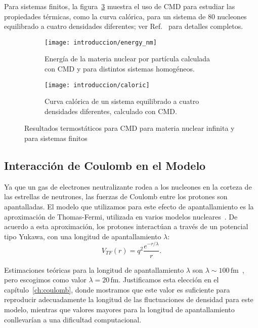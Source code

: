 Para sistemas finitos, la figura~\ref{fig:caloric} muestra el uso de CMD para estudiar las propiedades térmicas, como la curva calórica, para un sistema de 80 nucleones equilibrado a cuatro densidades diferentes; ver Ref.~\cite{dorso_isoscaling_2011} para detalles completos.

\begin{figure}[h]
  \centering
  \begin{subfigure}[h!]{0.48\columnwidth}
    \texttt{[image: introduccion/energy\_nm]}
  \caption{Energía de la materia nuclear por partícula calculada con CMD y para distintos sistemas homogéneos.}
  \label{fig:energy_nm}
  \end{subfigure}
  \begin{subfigure}[h!]{0.48\columnwidth}
  \texttt{[image: introduccion/caloric]}
  \caption{Curva calórica de un sistema equilibrado a cuatro densidades diferentes, calculado con CMD.}
  \label{fig:caloric}
  \end{subfigure}
  \caption{Resultados termostáticos para CMD para materia nuclear infinita y para sistemas finitos}
\end{figure}


\subsection{Interacción de Coulomb en el Modelo}\label{sc:coulomb}

Ya que un gas de electrones neutralizante rodea a los nucleones en la corteza de las estrellas de neutrones, las fuerzas de Coulomb entre los protones son apantalladas.
El modelo que utilizamos para este efecto de apantallamiento es la aproximación de Thomas-Fermi, utilizada en varios modelos nucleares~\cite{maruyama_quantum_1998, dorso_topological_2012, horowitz_neutrino-pasta_2004}.
De acuerdo a esta aproximación, los protones interactúan a través de un potencial tipo Yukawa, con una longitud de apantallamiento $\lambda$:
\begin{equation*}
 V_{TF}(r) = q^2\frac{e^{-r/\lambda}}{r}.
\end{equation*}

Estimaciones teóricas para la longitud de apantallamiento $\lambda$ son $\lambda\sim100\,\text{fm}$~\cite{fetter_quantum_2003}, pero escogimos como valor $\lambda=20\,\text{fm}$.
Justificamos esta elección en el capítulo~\ref{ch:coulomb}, donde mostramos que este valor es suficiente para reproducir adecuadamente la longitud de las fluctuaciones de densidad para este modelo, mientras que valores mayores para la longitud de apantallamiento conllevarían a una dificultad computacional.

